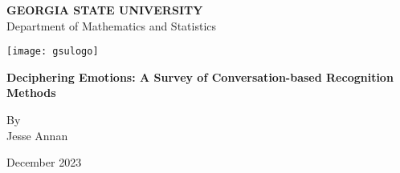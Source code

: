 \begin{titlepage}
	\begin{center}
		
		\LARGE
		\textbf{GEORGIA STATE UNIVERSITY} \\
		Department of Mathematics and Statistics
		
		\vspace{0.35in}
		
		\texttt{[image: gsulogo]}
		
		\vspace{0.5in}
		
		\textbf{Deciphering Emotions: A Survey of Conversation-based Recognition Methods}
		
		\vspace{0.8in}
		
		{\Large By} \\ \vspace{0.2in}
		{\huge Jesse Annan} 
		
		\vspace{1in}
            \large
		December 2023
		
	\end{center}
\end{titlepage}